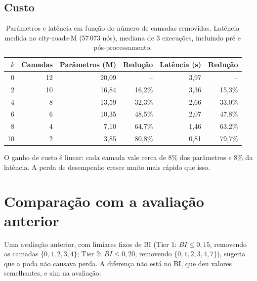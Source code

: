 \documentclass[11pt,a4paper]{article}
\begin{document}
\subsection{Custo}

\begin{table}[H]
\centering
\caption{Parâmetros e latência em função do número de camadas removidas. Latência medida no city-roads-M (57\,073 nós), mediana de 3 execuções, incluindo pré e pós-processamento.}
\label{tab:custo}
\begin{tabular}{@{}rrrrrr@{}}
\toprule
$k$ & Camadas & Parâmetros (M) & Redução & Latência (s) & Redução \\
\midrule
0  & 12 & 20,09 & --     & 3,97 & --     \\
2  & 10 & 16,84 & 16,2\% & 3,36 & 15,3\% \\
4  & 8  & 13,59 & 32,3\% & 2,66 & 33,0\% \\
6  & 6  & 10,35 & 48,5\% & 2,07 & 47,8\% \\
8  & 4  & 7,10  & 64,7\% & 1,46 & 63,2\% \\
10 & 2  & 3,85  & 80,8\% & 0,81 & 79,7\% \\
\bottomrule
\end{tabular}
\end{table}

O ganho de custo é linear: cada camada vale cerca de 8\% dos parâmetros e 8\% da latência. A perda de desempenho cresce muito mais rápido que isso.

\section{Comparação com a avaliação anterior}

Uma avaliação anterior, com limiares fixos de BI (Tier 1: $BI \leq 0{,}15$, removendo as camadas $\{0,1,2,3,4\}$; Tier 2: $BI \leq 0{,}20$, removendo $\{0,1,2,3,4,7\}$), sugeria que a poda não causava perda. A diferença não está no BI, que deu valores semelhantes, e sim na avaliação:
\end{document}
